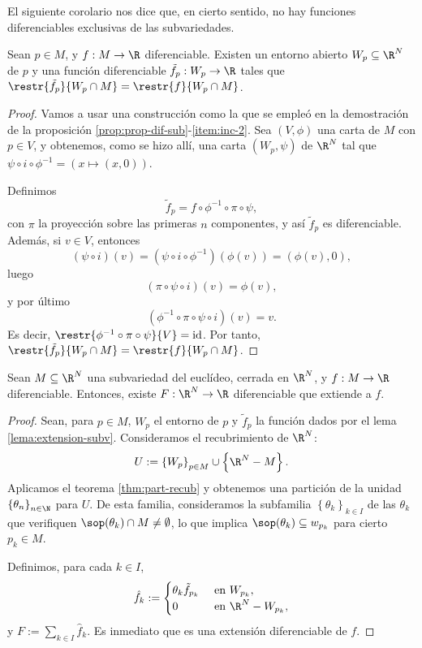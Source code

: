 El siguiente corolario nos dice que, en cierto sentido, no hay funciones
diferenciables exclusivas de las subvariedades.
\begin{lema} \label{lema:extension-subv}
  Sean $p\in M$, y $f:M\to \R$ diferenciable. Existen un entorno abierto $W_{p}\subseteq \R^{N}$ de $p$ y una
  función diferenciable $\tilde{f}_{p}: W_{p}\to \R$ tales que
  $\restr{\tilde{f_{p}}}{W_{p}\cap M} = \restr{f}{W_{p}\cap M}$.
\end{lema}
\begin{proof}
  Vamos a usar una construcción como la que se empleó en la demostración de la
  proposición \ref{prop:prop-dif-sub}-\ref{item:inc-2}. Sea $(V,\phi)$ una carta
  de $M$ con $p\in V$, y obtenemos, como se hizo allí, una carta $(W_{p},\psi)$ de $\R^{N}$ tal
  que $\psi\circ i\circ\phi^{-1} = (x\mapsto (x,0))$.

  Definimos
  \[
    \tilde{f}_{p} = f\circ \phi^{-1} \circ\pi\circ\psi
    ,\]
  con $\pi$ la proyección sobre las primeras $n$ componentes, y así
  $\tilde{f}_{p}$ es diferenciable. Además, si $v\in V$, entonces
  \[
    (\psi\circ i)(v) = (\psi\circ i \circ\phi^{-1})(\phi(v)) = (\phi(v), 0)
    ,\]
  luego
  \[
    (\pi\circ\psi\circ i)(v) = \phi(v)
    ,\]
  y por último
  \[
    (\phi^{-1}\circ\pi\circ\psi\circ i)(v) = v
    .\]
  Es decir, $\restr{\phi^{-1}\circ\pi\circ\psi}{V} = \mathrm{id}$. Por tanto,
  $\restr{\tilde{f}_{p}}{W_{p}\cap M} = \restr{f}{W_{p}\cap M}$.
\end{proof}
\begin{ncor} \label{cor:ext-fun-subv}
  Sean $M\subseteq \R^{N}$ una subvariedad del euclídeo, cerrada en $\R^{N}$, y
  $f:M\to\R$ diferenciable. Entonces, existe $F:\R^{N}\to\R$ diferenciable que
  extiende a $f$.
\end{ncor}
\begin{proof}
  Sean, para $p\in M$, $W_{p}$ el entorno de $p$ y $\tilde{f}_{p}$ la función
  dados por el lema \ref{lema:extension-subv}. Consideramos el recubrimiento de
  $\R^{N}$:
  \[
    U := \left\{ W_{p} \right\}_{p\in M} \cup \left\{ \R^{N}-M \right\}
    .\]
  Aplicamos el teorema \ref{thm:part-recub} y obtenemos una partición de la
  unidad $\left\{ \theta_{n} \right\}_{n\in\N}$ para $U$. De esta familia,
  consideramos la subfamilia $\left\{ \theta_{k} \right\}_{k\in I}$ de las
  $\theta_{k}$ que verifiquen $\sop(\theta_{k})\cap M \ne \emptyset$, lo que
  implica $\sop(\theta_{k}) \subseteq w_{p_{k}}$ para cierto $p_{k}\in M$.

  Definimos, para cada $k\in I$,
  \[
    \hat{f}_{k} :=
    \begin{cases}
      \theta_{k}\tilde{f}_{p_{k}} & \text{ en $W_{p_{k}}$}, \\
      0 & \text{ en $\R^{N}-W_{p_{k}}$},
    \end{cases}
  \]
  y $F := \sum_{k\in I} \hat{f}_{k}$. Es inmediato que es una extensión
  diferenciable de $f$.
\end{proof}

